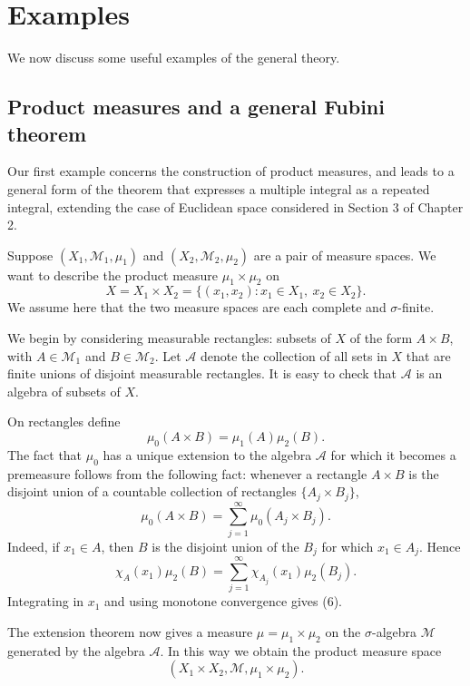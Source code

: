 \documentclass[11pt,openany]{book}
\begin{document}
\section{Examples}

We now discuss some useful examples of the general theory.

\subsection{Product measures and a general Fubini theorem}

Our first example concerns the construction of product measures, and leads to a general form of the theorem that expresses a multiple integral as a repeated integral, extending the case of Euclidean space considered in Section 3 of Chapter 2.

Suppose $(X_1,\mathcal M_1,\mu_1)$ and $(X_2,\mathcal M_2,\mu_2)$ are a pair of measure spaces. We want to describe the product measure $\mu_1\times\mu_2$ on
\[
X=X_1\times X_2=\{(x_1,x_2):x_1\in X_1,\ x_2\in X_2\}.
\]
We assume here that the two measure spaces are each complete and $\sigma$-finite.

We begin by considering measurable rectangles: subsets of $X$ of the form $A\times B$, with $A\in\mathcal M_1$ and $B\in\mathcal M_2$. Let $\mathcal A$ denote the collection of all sets in $X$ that are finite unions of disjoint measurable rectangles. It is easy to check that $\mathcal A$ is an algebra of subsets of $X$.

On rectangles define
\[
\mu_0(A\times B)=\mu_1(A)\mu_2(B).
\]
The fact that $\mu_0$ has a unique extension to the algebra $\mathcal A$ for which it becomes a premeasure follows from the following fact: whenever a rectangle $A\times B$ is the disjoint union of a countable collection of rectangles $\{A_j\times B_j\}$,
\begin{equation}
\mu_0(A\times B)=\sum_{j=1}^{\infty}\mu_0(A_j\times B_j).
\tag{6}
\end{equation}
Indeed, if $x_1\in A$, then $B$ is the disjoint union of the $B_j$ for which $x_1\in A_j$. Hence
\[
\chi_A(x_1)\mu_2(B)=\sum_{j=1}^{\infty}\chi_{A_j}(x_1)\mu_2(B_j).
\]
Integrating in $x_1$ and using monotone convergence gives (6).

The extension theorem now gives a measure $\mu=\mu_1\times\mu_2$ on the $\sigma$-algebra $\mathcal M$ generated by the algebra $\mathcal A$. In this way we obtain the product measure space
\[
(X_1\times X_2,\mathcal M,\mu_1\times\mu_2).
\]
\end{document}
